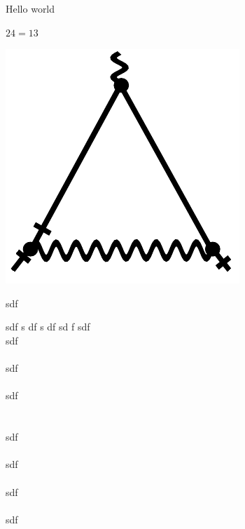 \documentclass[10pt,a4paper]{article}
\begin{document}
Hello world

$24 = 13$


\includegraphics[scale=.3]{test2.pdf} 

sdf

sdf
s
df
s
df
sd
f
sdf\\
sdf\\\\
sdf\\\\
sdf\\\\
\\
sdf\\\\
sdf\\\\
sdf\\\\
sdf\\\\
\end{document}
